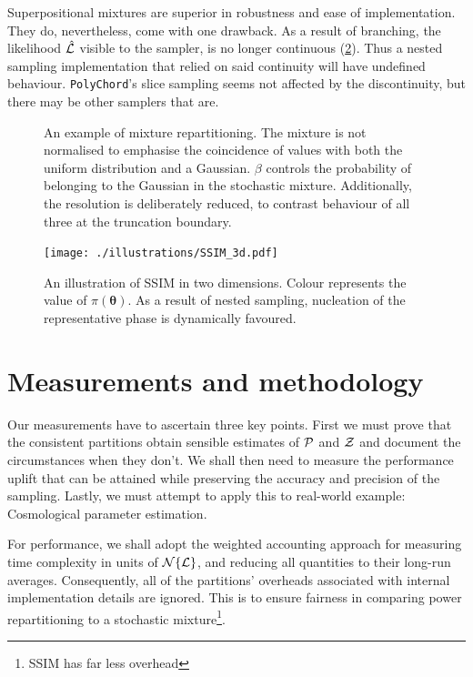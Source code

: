 \documentclass[usenatbib]{mnras}
\begin{document}
Superpositional mixtures are superior in robustness and ease of
implementation. They do, nevertheless, come with one drawback. As a
result of branching, the likelihood $\hat{\cal L}$ visible to the
sampler, is no longer continuous (\cref{fig:mixture-3d}). Thus a
nested sampling implementation that relied on said continuity will
have undefined behaviour. \texttt{PolyChord}'s slice sampling seems
not affected by the discontinuity, but there may be other samplers
that are.
\begin{figure}  
  

  

  
  \caption{An example of mixture repartitioning. The mixture is not
    normalised to emphasise the coincidence of values with both the
    uniform distribution and a Gaussian. $\beta$ controls the
    probability of belonging to the Gaussian in the stochastic
    mixture.  Additionally, the resolution is deliberately reduced, to
    contrast behaviour of all three at the truncation
    boundary. \label{fig:mixture}}
\end{figure}

\begin{figure}
  \centering
  \texttt{[image: ./illustrations/SSIM\_3d.pdf]}
  \caption{An illustration of SSIM in two dimensions. Colour represents the value of $\pi(\bm{\theta})$. As a result of nested sampling, nucleation of the representative phase is dynamically favoured.}
  \label{fig:mixture-3d}
\end{figure}


\section{Measurements and methodology}
Our measurements have to ascertain three key points. First we must
prove that the consistent partitions obtain sensible estimates of
${\cal P}$ and ${\cal Z}$ and document the circumstances when they
don't. We shall then need to measure the performance uplift that can
be attained while preserving the accuracy and precision of the
sampling. Lastly, we must attempt to apply this to real-world example:
Cosmological parameter estimation. 

For performance, we shall adopt the weighted accounting approach
\citep{Cormen} for measuring time complexity in units of
\({\cal N}\{{\cal L}\}\), and reducing all quantities to their
long-run averages. Consequently, all of the partitions' overheads
associated with internal implementation details are ignored. This is
to ensure fairness in comparing power repartitioning to a stochastic
mixture\footnote{SSIM has far less overhead}.
\end{document}
